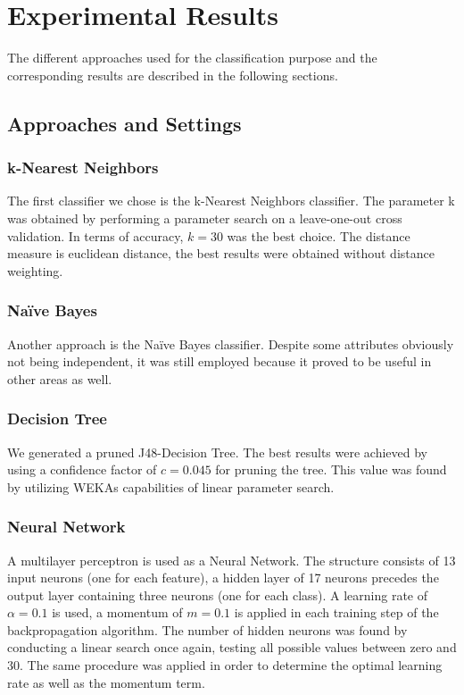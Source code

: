 \section{Experimental Results}
The different approaches used for the classification purpose and the corresponding results are described in the following sections.

\subsection{Approaches and Settings}

\subsubsection*{k-Nearest Neighbors}
The first classifier we chose is the k-Nearest Neighbors classifier. The
parameter k was obtained by performing a parameter search on a
leave-one-out cross validation. In terms of accuracy, \(k=30\) was
the best choice. The distance measure is euclidean distance, the best
results were obtained without distance weighting.

\subsubsection*{Na\"ive Bayes}
Another approach is the Na\"ive Bayes classifier. Despite some
attributes obviously not being independent, it was still employed
because it proved to be useful in other areas as well.

\subsubsection*{Decision Tree}
We generated a pruned J48-Decision Tree. The best results were
achieved by using a confidence factor of \(c=0.045\) for pruning the
tree. This value was found by utilizing WEKAs capabilities of linear
parameter search.

\subsubsection*{Neural Network}
A multilayer perceptron is used as a Neural Network. The structure
consists of 13 input neurons (one for each feature), a hidden layer
of 17 neurons precedes the output layer containing three neurons
(one for each class). A learning rate of \(\alpha=0.1\) is used, a momentum of
\(m=0.1\) is applied in each training step of the backpropagation
algorithm. The number of hidden
neurons was found by conducting a linear search once again, testing
all possible values between zero and 30. The same procedure was
applied in order to determine the optimal learning rate as well as the
momentum term.

